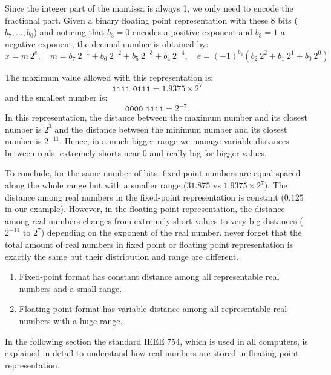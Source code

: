 Since the integer part of the mantissa is always 1, we only need to encode the fractional part.
Given a binary floating point representation with these 8 bits ($b_7, \ldots, b_0$) 
and noticing that $b_3 = 0$ encodes a positive exponent and $b_3 = 1$ a negative exponent, 
the decimal number is obtained by:
$$
   x = m \ 2^e, \quad m =  b_7 \ 2^{-1}  + b_6 \ 2^{-2} + b_5 \ 2^{-3} + b_4 \ 2^{-4}, \quad 
    e =  (-1)^{b_3} (  b_2 \ 2^{2} + b_1 \ 2^{1} + b_0 \ 2^{0} ) 
$$

The maximum value allowed with this representation is: 
$$
   \texttt{1111 0111} = 1.9375 \times 2^{7}
$$   
and the smallest number is: 
$$
   \texttt{0000 1111} =  2^{-7}.
$$ 
In this representation, the distance between the maximum number and its closest number is $2^3$
and the distance between the minimum number and its closest number is $ 2^{-11}$. Hence, in a 
much bigger range we manage variable distances between reals, extremely shorts near 0 and really big 
for bigger values. 





To conclude, for the same number of bits, fixed-point numbers are equal-spaced along 
the whole range but with a smaller range ($31.875$ vs $ 1.9375 \times 2^{7}$).
The distance among real numbers in the fixed-point representation is constant ($0.125$ in our example). 
However, in the floating-point representation, the distance among real numbers 
changes from extremely short values to very big distances ($2^{-11}$ to $ 2^{7}$) depending on the exponent of the real number. 
never forget that the total amount of real numbers in fixed point or floating point 
representation is exactly the same but their distribution and range are different.


\begin{IN}
    \begin{enumerate}
        \item Fixed-point format has constant distance among all representable real numbers and a small range. 
        \item Floating-point format has variable distance among all representable real numbers with a huge range.  
    \end{enumerate}
\end{IN}


In the following section the standard IEEE 754, which is used in all computers, is 
explained in detail to understand how real numbers are stored in floating point representation.


